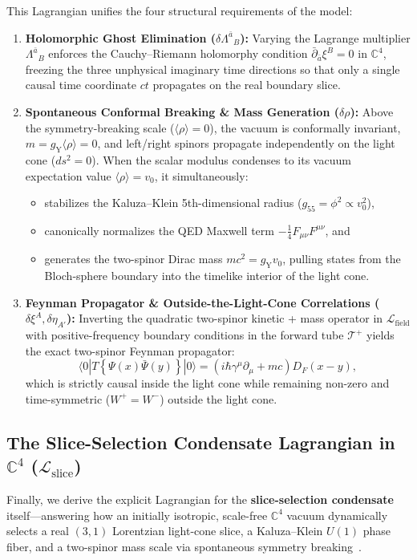 \documentclass[11pt,a4paper]{article}
\begin{document}
This Lagrangian unifies the four structural requirements of the model:
\begin{enumerate}
    \item \textbf{Holomorphic Ghost Elimination ($\delta \Lambda^{\bar{a}}{}_B$):} Varying the Lagrange multiplier $\Lambda^{\bar{a}}{}_B$ enforces the Cauchy--Riemann holomorphy condition $\bar{\partial}_{\bar{a}}\xi^B = 0$ in $\mathbb{C}^4$, freezing the three unphysical imaginary time directions so that only a single causal time coordinate $ct$ propagates on the real boundary slice.
    \item \textbf{Spontaneous Conformal Breaking \& Mass Generation ($\delta \rho$):} Above the symmetry-breaking scale ($\langle \rho \rangle = 0$), the vacuum is conformally invariant, $m = g_{\text{Y}}\langle\rho\rangle = 0$, and left/right spinors propagate independently on the light cone ($ds^2 = 0$). When the scalar modulus condenses to its vacuum expectation value $\langle \rho \rangle = v_0$, it simultaneously:
    \begin{itemize}
        \item stabilizes the Kaluza--Klein 5th-dimensional radius ($g_{55} = \phi^2 \propto v_0^2$),
        \item canonically normalizes the QED Maxwell term $-\frac{1}{4}F_{\mu\nu}F^{\mu\nu}$, and
        \item generates the two-spinor Dirac mass $m c^2 = g_{\text{Y}} v_0$, pulling states from the Bloch-sphere boundary into the timelike interior of the light cone.
    \end{itemize}
    \item \textbf{Feynman Propagator \& Outside-the-Light-Cone Correlations ($\delta \xi^A, \delta \eta_{A'}$):} Inverting the quadratic two-spinor kinetic + mass operator in $\mathcal{L}_{\text{field}}$ with positive-frequency boundary conditions in the forward tube $\mathcal{T}^+$ yields the exact two-spinor Feynman propagator:
    \begin{equation}
    \langle 0 | T\!\left\{ \Psi(x) \bar{\Psi}(y) \right\} | 0 \rangle = \left( i\hbar\gamma^\mu \partial_\mu + mc \right) D_F(x - y),
    \end{equation}
    which is strictly causal inside the light cone while remaining non-zero and time-symmetric ($W^+ = W^-$) outside the light cone.
\end{enumerate}

\subsection{The Slice-Selection Condensate Lagrangian in \texorpdfstring{$\mathbb{C}^4$}{C4} (\texorpdfstring{$\mathcal{L}_{\text{slice}}$}{L\_slice})}
Finally, we derive the explicit Lagrangian for the \textbf{slice-selection condensate} itself---answering how an initially isotropic, scale-free $\mathbb{C}^4$ vacuum dynamically selects a real $(3,1)$ Lorentzian light-cone slice, a Kaluza--Klein $U(1)$ phase fiber, and a two-spinor mass scale via spontaneous symmetry breaking~\cite{Higgs1964,PenroseRindler1984}.
\end{document}

